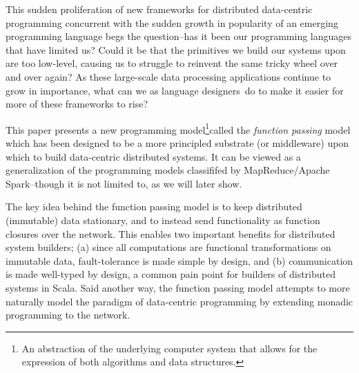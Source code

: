 \documentclass{jfp1}
\newcommand{\FP}{{\emph{function passing}}}
\newcommand{\comment}[1]{}
\begin{document}

This sudden proliferation of new frameworks for distributed data-centric
programming concurrent with the sudden growth in popularity of an emerging
programming language begs the question--has it been our programming languages
that have limited us? Could it be that the primitives we build our systems upon
are too low-level, causing us to struggle to reinvent the same tricky wheel over
and over again? As these large-scale data processing applications continue to
grow in importance, what can we as language designers~\comment{sounds like we want to adapt/ modify/ improve one of those
previously mentioned "emerging programming languages"}do to make it easier for
more of these frameworks to rise?

This paper presents a new programming model\footnote{An abstraction of the
underlying computer system that allows for the expression of both algorithms and
data structures.}called the {\FP} model which has been designed to be a more
principled substrate (or middleware) upon which to build data-centric
distributed systems. It can be viewed as a generalization of the programming
models classififed by MapReduce/Apache Spark--though it is not limited to, as we
will later show.


The key idea behind the function passing model is to keep distributed
(immutable) data stationary, and to instead send functionality as function
closures over the network. This enables two important benefits for distributed
system builders; (a) since all computations are functional transformations on
immutable data, fault-tolerance is made simple by design, and (b) communication
is made well-typed by design, a common pain point for builders of distributed
systems in Scala. Said another way, the function passing model attempts to more
naturally model the paradigm of data-centric programming by extending monadic
programming to the network.
\end{document}
